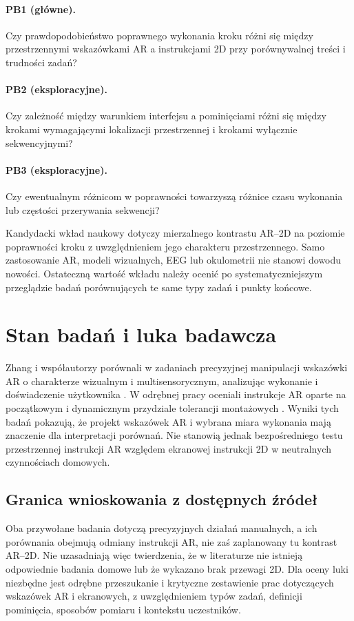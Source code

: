 \documentclass[11pt,a4paper]{article}
\begin{document}
\paragraph{PB1 (główne).} Czy prawdopodobieństwo poprawnego wykonania kroku różni się między przestrzennymi wskazówkami AR a instrukcjami 2D przy porównywalnej treści i trudności zadań?
\paragraph{PB2 (eksploracyjne).} Czy zależność między warunkiem interfejsu a pominięciami różni się między krokami wymagającymi lokalizacji przestrzennej i krokami wyłącznie sekwencyjnymi?
\paragraph{PB3 (eksploracyjne).} Czy ewentualnym różnicom w poprawności towarzyszą różnice czasu wykonania lub częstości przerywania sekwencji?

Kandydacki wkład naukowy dotyczy mierzalnego kontrastu AR--2D na poziomie poprawności kroku z uwzględnieniem jego charakteru przestrzennego. Samo zastosowanie AR, modeli wizualnych, EEG lub okulometrii nie stanowi dowodu nowości. Ostateczną wartość wkładu należy ocenić po systematyczniejszym przeglądzie badań porównujących te same typy zadań i punkty końcowe.

\section{Stan badań i luka badawcza}
Zhang i współautorzy porównali w zadaniach precyzyjnej manipulacji wskazówki AR o charakterze wizualnym i multisensorycznym, analizując wykonanie i doświadczenie użytkownika \cite{xrprior1}. W odrębnej pracy oceniali instrukcje AR oparte na początkowym i dynamicznym przydziale tolerancji montażowych \cite{xrprior2}. Wyniki tych badań pokazują, że projekt wskazówek AR i wybrana miara wykonania mają znaczenie dla interpretacji porównań. Nie stanowią jednak bezpośredniego testu przestrzennej instrukcji AR względem ekranowej instrukcji 2D w neutralnych czynnościach domowych.

\subsection{Granica wnioskowania z dostępnych źródeł}
Oba przywołane badania dotyczą precyzyjnych działań manualnych, a ich porównania obejmują odmiany instrukcji AR, nie zaś zaplanowany tu kontrast AR--2D. Nie uzasadniają więc twierdzenia, że w literaturze nie istnieją odpowiednie badania domowe lub że wykazano brak przewagi 2D. Dla oceny luki niezbędne jest odrębne przeszukanie i krytyczne zestawienie prac dotyczących wskazówek AR i ekranowych, z uwzględnieniem typów zadań, definicji pominięcia, sposobów pomiaru i kontekstu uczestników.
\end{document}
